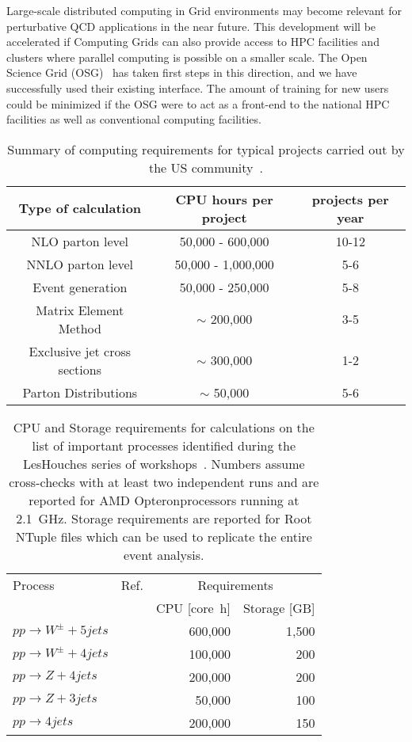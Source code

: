 Large-scale distributed computing in Grid environments 
may become relevant for perturbative QCD applications 
in the near future. This development will be accelerated if Computing Grids
can also provide access to HPC facilities and clusters where parallel 
computing is possible on a smaller scale. The Open Science Grid (OSG)~\cite{OSG} 
has taken first steps in this direction, and we have successfully used their
existing interface. The amount of training for new users could be minimized
if the OSG were to act as a front-end to the national HPC facilities
as well as conventional computing facilities.

\begin{table}
  \begin{tabular}{ccc}
    \hline
    Type of calculation & CPU hours per project & projects per year \\
    \hline\hline
    NLO parton level & 50,000 - 600,000 & 10-12\\
    NNLO parton level & 50,000 - 1,000,000 & 5-6\\
    Event generation & 50,000 - 250,000 & 5-8\\
    Matrix Element Method & $\sim$ 200,000 & 3-5\\
    Exclusive jet cross sections & $\sim$ 300,000 & 1-2\\
    Parton Distributions & $\sim$ 50,000 & 5-6\\
    \hline
  \end{tabular}
  \caption{Summary of computing requirements for typical projects
    carried out by the US community~\cite{HPCWP}.
    \label{tab:summary}}
\end{table}

\clearpage

\begin{table}
  \centering
  \begin{tabular}{llrr}
    \hline
    Process & Ref. & \multicolumn{2}{c}{Requirements}\\
    & & CPU [core~h] & Storage [GB] \\
    \hline\hline
    $pp\to W^\pm+5 jets$ & \cite{Bern:2013gka} & 600,000 & 1,500 \\
    $pp\to W^\pm+4 jets$ & \cite{Berger:2010zx} & 100,000 & 200\\
    $pp\to Z+4 jets$ & \cite{Ita:2011wn} & 200,000 & 200\\
    $pp\to Z+3 jets$ & \cite{Berger:2010vm} & 50,000 & 100 \\
    $pp\to 4 jets$ & \cite{Bern:2011ep} & 200,000 & 150\\
    \hline
  \end{tabular}
  \caption{CPU and Storage requirements for calculations on the
    list of important processes identified during the LesHouches
    series of workshops~\cite{AlcarazMaestre:2012vp}.
    Numbers assume cross-checks with at least two independent runs
    and are reported for AMD Opteron\trademark processors running at 2.1~GHz.
    Storage requirements are reported for Root NTuple files which can be used
    to replicate the entire event analysis.
  \label{tab:nlo_wishlist}}
\end{table}


